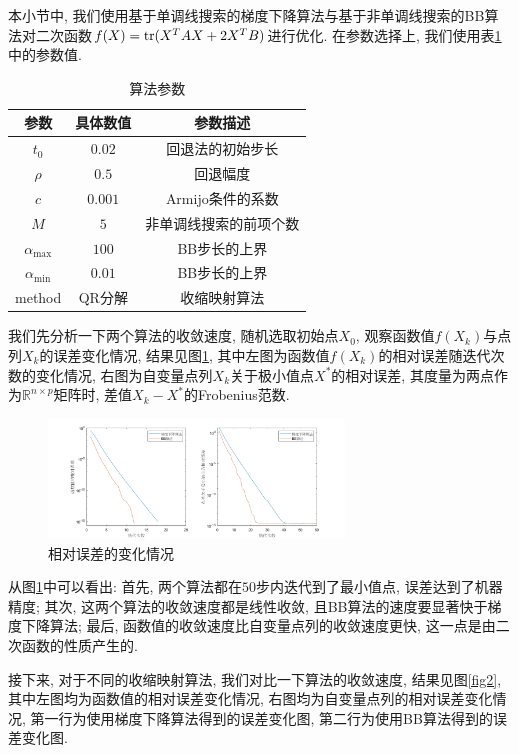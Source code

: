 \documentclass[UTF8]{ctexart}
\begin{document}
本小节中, 我们使用基于单调线搜索的梯度下降算法与基于非单调线搜索的BB算法对二次函数$f(X)=\textup{tr}(X^T AX+2X^T B)$进行优化. 在参数选择上, 我们使用表\ref{tab1}中的参数值. \par
\begin{table}[htb]
    \centering
    \begin{tabular}{c|cc}
        \hline
        \hline
        参数 & 具体数值 & 参数描述\\
        \hline
        $t_0$ & $0.02$ & 回退法的初始步长\\
        $\rho$ & $0.5$ & 回退幅度\\
        $c$ & $0.001$ & Armijo条件的系数\\
        $M$ & $5$ & 非单调线搜索的前项个数\\
        $\alpha_{\max}$ & $100$ & BB步长的上界\\
        $\alpha_{\min}$ & $0.01$ & BB步长的上界\\
        method & QR分解 & 收缩映射算法\\
        \hline
        \hline
    \end{tabular}
    \caption{算法参数}\label{tab1}
\end{table}
我们先分析一下两个算法的收敛速度, 随机选取初始点$X_0$, 观察函数值$f(X_k)$与点列$X_k$的误差变化情况, 结果见图\ref{fig1}, 其中左图为函数值$f(X_k)$的相对误差随迭代次数的变化情况, 右图为自变量点列$X_k$关于极小值点$X^*$的相对误差, 其度量为两点作为$\mathbb{R}^{n\times p}$矩阵时, 差值$X_k-X^*$的Frobenius范数. \par
\begin{figure}[htb]
    \centering
    \includegraphics[width=0.7\textwidth]{Q2-figure/1.png}
    \caption{相对误差的变化情况}\label{fig1}
\end{figure}
从图\ref{fig1}中可以看出: 首先, 两个算法都在$50$步内迭代到了最小值点, 误差达到了机器精度; 其次, 这两个算法的收敛速度都是线性收敛, 且BB算法的速度要显著快于梯度下降算法; 最后, 函数值的收敛速度比自变量点列的收敛速度更快, 这一点是由二次函数的性质产生的. \par
接下来, 对于不同的收缩映射算法, 我们对比一下算法的收敛速度, 结果见图\ref{fig2}, 其中左图均为函数值的相对误差变化情况, 右图均为自变量点列的相对误差变化情况, 第一行为使用梯度下降算法得到的误差变化图, 第二行为使用BB算法得到的误差变化图. \par
\end{document}
